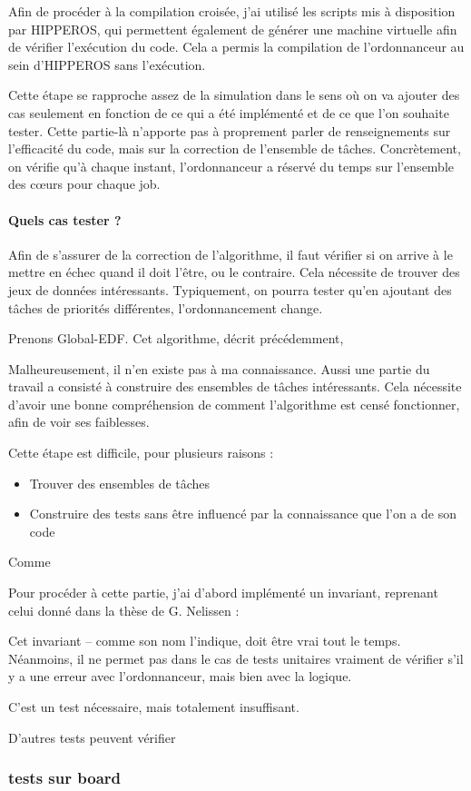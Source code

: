 	Afin de procéder à la compilation croisée, j'ai utilisé les scripts mis à disposition par HIPPEROS, 
	qui permettent également de générer une machine virtuelle afin de vérifier l'exécution du code. 
	Cela a permis la compilation de l'ordonnanceur au sein d'HIPPEROS sans l'exécution.
	
	Cette étape se rapproche assez de la simulation dans le sens où on va ajouter des cas seulement 
	en fonction de ce qui a été implémenté et de ce que l'on souhaite tester. Cette partie-là n'apporte pas 
	à proprement parler de renseignements sur l'efficacité du code, mais sur la correction de l'ensemble de tâches.
	Concrètement, on vérifie qu'à chaque instant, l'ordonnanceur a réservé du temps sur l'ensemble des cœurs 
	pour chaque job. 
	
	\paragraph{Quels cas tester ?}
	Afin de s'assurer de la correction de l'algorithme, il faut vérifier si on arrive à le mettre en échec quand 
	il doit l'être, ou le contraire. Cela nécessite de trouver des jeux de données intéressants. 
	Typiquement, on pourra tester qu'en ajoutant des tâches de priorités différentes, 
	l'ordonnancement change. 
	
	Prenons Global-EDF. Cet algorithme, décrit précédemment, 
	
	
	
	Malheureusement, il n'en existe pas à ma connaissance. Aussi une partie du travail a consisté 
	à construire des ensembles de tâches intéressants. Cela nécessite d'avoir une bonne 
	compréhension de comment l'algorithme est censé fonctionner, afin de voir ses faiblesses.
	
	Cette étape est difficile, pour plusieurs raisons :
	\begin{itemize}
		\item Trouver des ensembles de tâches
		\item Construire des tests sans être influencé par la connaissance que l'on a de son code
	\end{itemize}
	
	
	Comme 
	
	
	Pour procéder à cette partie, j'ai d'abord implémenté un invariant, reprenant celui donné dans la 
	thèse de G. Nelissen : 
	
	
	Cet invariant -- comme son nom l'indique, doit être vrai tout le temps. Néanmoins, il ne permet pas 
	dans le cas de tests unitaires vraiment de vérifier s'il y a une erreur avec l'ordonnanceur, mais bien avec 
	la logique.
	
	C'est un test nécessaire, mais totalement insuffisant.
	
	D'autres tests peuvent vérifier 
	
	
	
		
	\subsubsection{tests sur board}	
	
	


